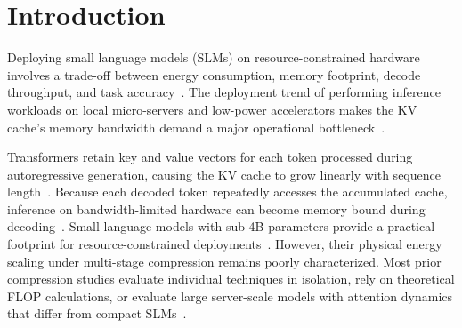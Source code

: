 \documentclass[sigconf,nonacm]{acmart}
\begin{document}

\maketitle

\section{Introduction}

Deploying small language models (SLMs) on resource-constrained hardware involves a trade-off between energy consumption, memory footprint, decode throughput, and task accuracy~\cite{strubell_energy_2019,patterson_carbon_2021,schwartz2020green}. The deployment trend of performing inference workloads on local micro-servers and low-power accelerators makes the KV cache's memory bandwidth demand a major operational bottleneck~\cite{li2024survey}.

Transformers retain key and value vectors for each token processed during autoregressive generation, causing the KV cache to grow linearly with sequence length~\cite{li2024survey}. Because each decoded token repeatedly accesses the accumulated cache, inference on bandwidth-limited hardware can become memory bound during decoding~\cite{dao_flashattention_2022}. Small language models with sub-4B parameters provide a practical footprint for resource-constrained deployments~\cite{husom_sustainable_2025}. However, their physical energy scaling under multi-stage compression remains poorly characterized. Most prior compression studies evaluate individual techniques in isolation, rely on theoretical FLOP calculations, or evaluate large server-scale models with attention dynamics that differ from compact SLMs~\cite{wang_slmquant_2025}.
\end{document}
